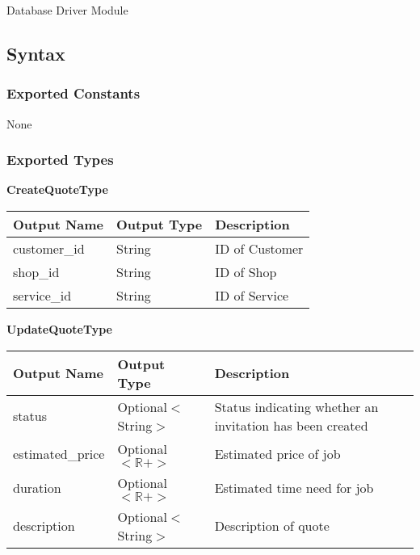 \documentclass[12pt, titlepage]{article}
\begin{document}
Database Driver Module

\subsection{Syntax}

\subsubsection{Exported Constants}

None

\subsubsection{Exported Types}

\textbf{CreateQuoteType}

\begin{table}[H]
	\begin{tabular}{|p{}|p{}|p{}|}
		\hline
		\textbf{Output Name} & \textbf{Output Type} & \textbf{Description} \\
		\hline
		customer\_id         & String               & ID of Customer       \\
		\hline
		shop\_id             & String               & ID of Shop           \\
		\hline
		service\_id          & String               & ID of Service        \\
		\hline
	\end{tabular}
\end{table}

\textbf{UpdateQuoteType}

\begin{table}[H]
	\begin{tabular}{|p{}|p{}|p{}|}
		\hline
		\textbf{Output Name} & \textbf{Output Type}    & \textbf{Description}                                     \\
		\hline
		status               & Optional$<$String$>$    & Status indicating whether an invitation has been created \\
		\hline
		estimated\_price     & Optional$<\mathbb{R}+>$ & Estimated price of job                                   \\
		\hline
		duration             & Optional$<\mathbb{R}+>$ & Estimated time need for job                              \\
		\hline
		description          & Optional$<$String$>$    & Description of quote                                     \\
		\hline
	\end{tabular}
\end{table}
\end{document}
